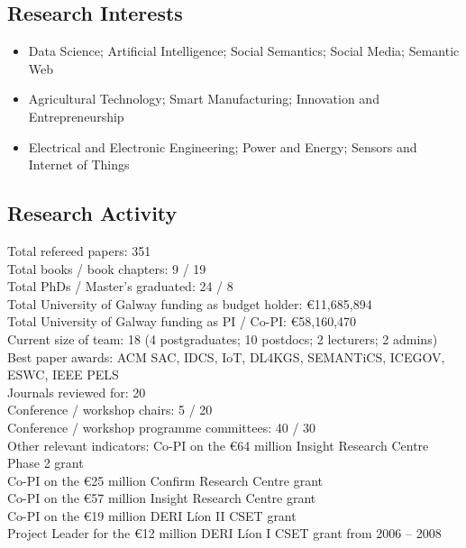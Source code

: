 \documentclass[10pt,a4paper]{res} %
\begin{document}
\begin{resume}
\subsection*{Research Interests}

\begin{itemize} \itemsep -2pt
\item Data Science; Artificial Intelligence; Social Semantics; Social Media; Semantic Web
\item Agricultural Technology; Smart Manufacturing; Innovation and Entrepreneurship
\item Electrical and Electronic Engineering; Power and Energy; Sensors and Internet of Things
\end{itemize}

\subsection*{Research Activity}

\begin{center}
Total refereed papers: \hfill 351 \\
Total books / book chapters: \hfill 9 / 19 \\
Total PhDs / Master's graduated: \hfill 24 / 8 \\
Total University of Galway funding as budget holder: \hfill \euro{}11,685,894 \\
Total University of Galway funding as PI / Co-PI: \hfill \euro{}58,160,470 \\
Current size of team: \hfill 18 (4 postgraduates; 10 postdocs; 2 lecturers; 2 admins) \\
Best paper awards: \hfill ACM SAC, IDCS, IoT, DL4KGS, SEMANTiCS, ICEGOV, ESWC, IEEE PELS \\
Journals reviewed for: \hfill 20 \\
Conference / workshop chairs: \hfill 5 / 20 \\
Conference / workshop programme committees: \hfill 40 / 30 \\
Other relevant indicators: \hfill Co-PI on the \euro{}64 million Insight Research Centre Phase 2 grant \\ \hfill Co-PI on the \euro{}25 million Confirm Research Centre grant \\ \hfill Co-PI on the \euro{}57 million Insight Research Centre grant \\ \hfill Co-PI on the \euro{}19 million DERI L\'{i}on II CSET grant \\ \hfill Project Leader for the \euro{}12 million DERI L\'{i}on I CSET grant from 2006 -- 2008
\end{center}


\end{resume}
\end{document}

